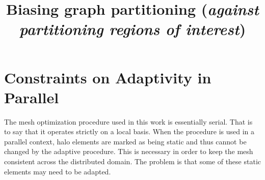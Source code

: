 \documentclass[11pt]{article}
\begin{document}

\date{}

\title{Biasing graph partitioning ({\it against partitioning regions of interest})}


\maketitle
\thispagestyle{empty}



\section{Constraints on Adaptivity in Parallel}
The mesh optimization procedure used in this work is essentially
serial. That is to say that it operates strictly on a local
basis. When the procedure is used in a parallel context, halo elements
are marked as being static and thus cannot be changed by the adaptive
procedure. This is necessary in order to keep the mesh consistent
across the distributed domain. The problem is that some of these
static elements may need to be adapted.
\end{document}
